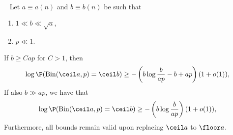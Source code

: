 \begin{lemma}
\label{lemma:binom_lb}
%
~\\~
    Let \(a \equiv a(n)\) and \(b \equiv b(n)\) be such that
    \begin{enumerate}
        \item \(1 \ll b \ll \sqrt{a}\),
        \item \(p \ll 1\). 
    \end{enumerate}
    If \(b \geq C ap\) for \(C > 1\), then 
    \begin{equation}
    \label{eq:binom_lb_small_b}
        \log \P(\mathrm{Bin}(\ceil a, p) = \ceil b) \geq -\left(b \log \frac{b}{a p} - b + ap\right) (1 + o(1)),
    \end{equation}
    If also \(b \gg ap\), we have that 
    \begin{equation}
    \label{eq:binom_lb_large_b}
        \log \P(\mathrm{Bin}(\ceil a, p) = \ceil b) \geq -\left(b \log \frac{b}{a p}\right) (1 + o(1)),
    \end{equation}
Furthermore, all bounds remain valid upon replacing \(\ceil a\) to \(\floor a\).
\end{lemma}
